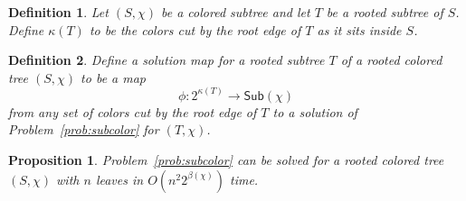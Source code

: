\documentclass{amsart}
\newcommand{\col}{\chi}
\newcommand{\subcolS}{\mathsf{Sub}}
\newcommand{\cut}{\kappa}
\newcommand{\bad}{\beta}
\newtheorem{prop}{Proposition}
\newtheorem{defn}{Definition}
\begin{document}
\begin{defn}
  Let $(S, \col)$ be a colored subtree and let $T$ be a rooted subtree of $S$.
  Define $\cut(T)$ to be the colors cut by the root edge of $T$ as it sits inside $S$.
\end{defn}

\begin{defn}
  Define a solution map for a rooted subtree $T$ of a rooted colored tree $(S, \col)$ to be a map
  \[
  \phi: 2^{\cut(T)} \rightarrow \subcolS(\col)
  \]
  from any set of colors cut by the root edge of $T$ to a solution of Problem~\ref{prob:subcolor} for $(T, \col)$.
\end{defn}


\begin{prop}
Problem~\ref{prob:subcolor} can be solved for a rooted colored tree $(S, \col)$ with $n$ leaves in $O(n^2 2^{\bad(\col)})$ time.
\end{prop}
\end{document}
